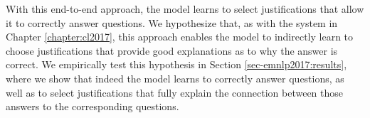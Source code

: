 
With this end-to-end approach, the model learns to select justifications that allow it to correctly answer questions.  We hypothesize that, as with the system in Chapter \ref{chapter:cl2017}, this approach enables the model to indirectly learn to choose justifications that provide good explanations as to why the answer is correct. We empirically test this hypothesis in Section \ref{sec-emnlp2017:results}, where we show that
 indeed the model learns to correctly answer questions, as well as to select justifications that fully explain the connection between those answers to the corresponding questions.
